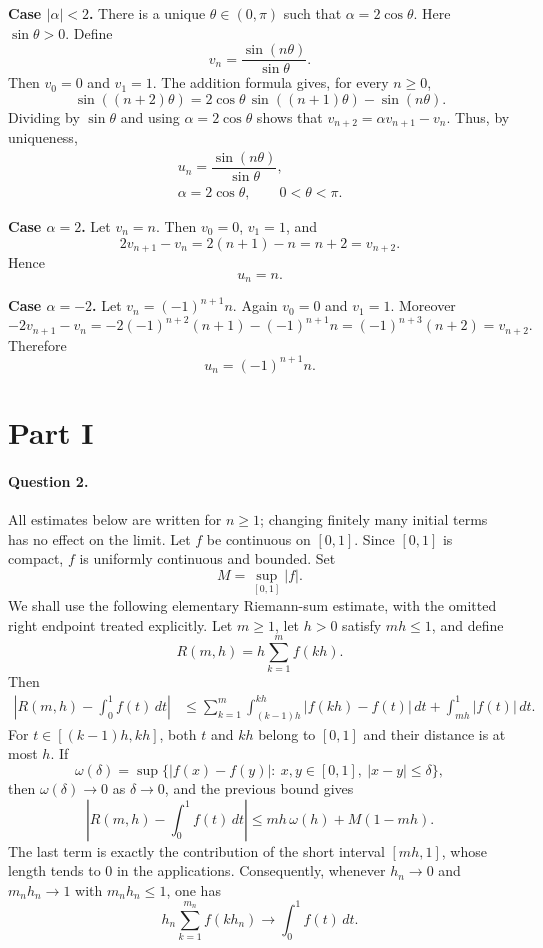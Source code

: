 \documentclass[11pt,a4paper]{article}
\begin{document}
\medskip
\noindent\textbf{Case $|\alpha|<2$.}  There is a unique
$\theta\in(0,\pi)$ such that $\alpha=2\cos\theta$.  Here
$\sin\theta>0$.  Define
\[
  v_n=\frac{\sin(n\theta)}{\sin\theta}.
\]
Then $v_0=0$ and $v_1=1$.  The addition formula gives, for every $n\ge0$,
\[
  \sin((n+2)\theta)
  =2\cos\theta\,\sin((n+1)\theta)-\sin(n\theta).
\]
Dividing by $\sin\theta$ and using $\alpha=2\cos\theta$ shows that
$v_{n+2}=\alpha v_{n+1}-v_n$.  Thus, by uniqueness,
\[
  \boxed{
  \begin{gathered}
    u_n=\dfrac{\sin(n\theta)}{\sin\theta},\\
    \alpha=2\cos\theta,\qquad 0<\theta<\pi.
  \end{gathered}}
\]

\medskip
\noindent\textbf{Case $\alpha=2$.}  Let $v_n=n$.  Then $v_0=0$,
$v_1=1$, and
\[
  2v_{n+1}-v_n=2(n+1)-n=n+2=v_{n+2}.
\]
Hence
\[
  \boxed{u_n=n.}
\]

\medskip
\noindent\textbf{Case $\alpha=-2$.}  Let $v_n=(-1)^{n+1}n$.
Again $v_0=0$ and $v_1=1$.  Moreover
\[
  -2v_{n+1}-v_n
  =-2(-1)^{n+2}(n+1)-(-1)^{n+1}n
  =(-1)^{n+3}(n+2)=v_{n+2}.
\]
Therefore
\[
  \boxed{u_n=(-1)^{n+1}n.}
\]

\section{Part I}

\paragraph{Question 2.}
All estimates below are written for $n\ge1$; changing finitely many initial
terms has no effect on the limit.
Let $f$ be continuous on $[0,1]$.  Since $[0,1]$ is compact, $f$ is uniformly
continuous and bounded.  Set
\[
  M=\sup_{[0,1]}|f|.
\]
We shall use the following elementary Riemann-sum estimate, with the omitted
right endpoint treated explicitly.  Let $m\ge1$, let $h>0$ satisfy
$mh\le1$, and define
\[
  R(m,h)=h\sum_{k=1}^m f(kh).
\]
Then
\[
\begin{aligned}
\left|R(m,h)-\int_0^1 f(t)\,dt\right|
&\le
  \sum_{k=1}^m
  \int_{(k-1)h}^{kh}|f(kh)-f(t)|\,dt
  +\int_{mh}^1 |f(t)|\,dt .
\end{aligned}
\]
For $t\in[(k-1)h,kh]$, both $t$ and $kh$ belong to $[0,1]$ and their distance
is at most $h$.  If
\[
  \omega(\delta)
  =
  \sup\{|f(x)-f(y)|:\ x,y\in[0,1],\ |x-y|\le\delta\},
\]
then $\omega(\delta)\to0$ as $\delta\to0$, and the previous bound gives
\[
  \left|R(m,h)-\int_0^1 f(t)\,dt\right|
  \le mh\,\omega(h)+M(1-mh).
\]
The last term is exactly the contribution of the short interval $[mh,1]$,
whose length tends to $0$ in the applications.  Consequently, whenever
$h_n\to0$ and $m_nh_n\to1$ with $m_nh_n\le1$, one has
\[
  h_n\sum_{k=1}^{m_n} f(kh_n)
  \longrightarrow
  \int_0^1 f(t)\,dt. \tag{2.1}
\]
\end{document}
